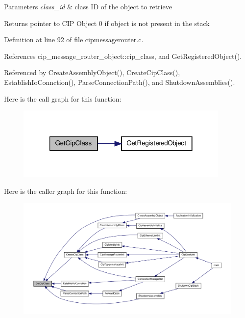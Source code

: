 \begin{DoxyParams}{\-Parameters}
{\em class\-\_\-id} & class \-I\-D of the object to retrieve \\
\hline
\end{DoxyParams}
\begin{DoxyReturn}{\-Returns}
pointer to \-C\-I\-P \-Object 0 if object is not present in the stack 
\end{DoxyReturn}


\-Definition at line 92 of file cipmessagerouter.\-c.



\-References cip\-\_\-message\-\_\-router\-\_\-object\-::cip\-\_\-class, and \-Get\-Registered\-Object().



\-Referenced by \-Create\-Assembly\-Object(), \-Create\-Cip\-Class(), \-Establish\-Io\-Connction(), \-Parse\-Connection\-Path(), and \-Shutdown\-Assemblies().



\-Here is the call graph for this function\-:
\nopagebreak
\begin{figure}[H]
\begin{center}
\leavevmode
\includegraphics[width=298pt]{d2/dc9/group__CIP__API_ga98bd609c80ece316406363575b4a89ea_cgraph}
\end{center}
\end{figure}




\-Here is the caller graph for this function\-:
\nopagebreak
\begin{figure}[H]
\begin{center}
\leavevmode
\includegraphics[width=350pt]{d2/dc9/group__CIP__API_ga98bd609c80ece316406363575b4a89ea_icgraph}
\end{center}
\end{figure}


